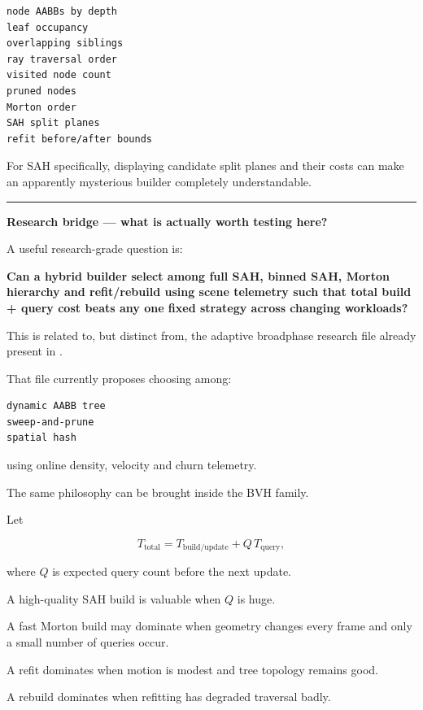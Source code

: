 \begin{verbatim}
node AABBs by depth
leaf occupancy
overlapping siblings
ray traversal order
visited node count
pruned nodes
Morton order
SAH split planes
refit before/after bounds
\end{verbatim}

For SAH specifically, displaying candidate split planes and their costs can make an apparently mysterious builder completely understandable.

\begin{center}\rule{0.5\linewidth}{0.5pt}\end{center}

\textbf{Research bridge --- what is actually worth testing here?}

A useful research-grade question is:

\textbf{Can a hybrid builder select among full SAH, binned SAH, Morton hierarchy and refit/rebuild using scene telemetry such that total build + query cost beats any one fixed strategy across changing workloads?}

This is related to, but distinct from, the adaptive broadphase research file already present in .

That file currently proposes choosing among:

\begin{verbatim}
dynamic AABB tree
sweep-and-prune
spatial hash
\end{verbatim}

using online density, velocity and churn telemetry.

The same philosophy can be brought inside the BVH family.

Let

\[
T_{\text{total}}
=
T_{\text{build/update}}
+
Q\,T_{\text{query}},
\]

where \(Q\) is expected query count before the next update.

A high-quality SAH build is valuable when \(Q\) is huge.

A fast Morton build may dominate when geometry changes every frame and only a small number of queries occur.

A refit dominates when motion is modest and tree topology remains good.

A rebuild dominates when refitting has degraded traversal badly.

